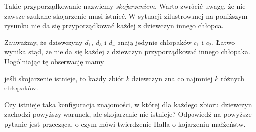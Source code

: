 \vspace{10px}
\noindent
Takie przyporządkowanie nazwiemy \textit{skojarzeniem}. Warto zwrócić uwagę, że nie zawsze szukane skojarzenie musi istnieć. W sytuacji zilustrowanej na poniższym rysunku nie da się przyporządkować każdej z dziewczyn innego chłopca.

\begin{center}
\end{center}

\vspace{10px}
\noindent
Zauważmy, że dziewczyny $d_1$, $d_3$ i $d_4$ znają jedynie chłopaków $c_1$ i $c_2$. Łatwo wynika stąd, że nie da się każdej z dziewczyn przyporządkować innego chłopaka. Uogólniając tę obserwację mamy
\begin{center}
	jeśli skojarzenie istnieje, to każdy zbiór $k$ dziewczyn zna co najmniej $k$ różnych chłopaków.
\end{center}

\vspace{10px}
\noindent
Czy istnieje taka konfiguracja znajomości, w której dla każdego zbioru dziewczyn zachodzi powyższy warunek, ale skojarzenie nie istnieje? Odpowiedź na powyższe pytanie jest przecząca, o czym mówi twierdzenie Halla o kojarzeniu małżeństw.


